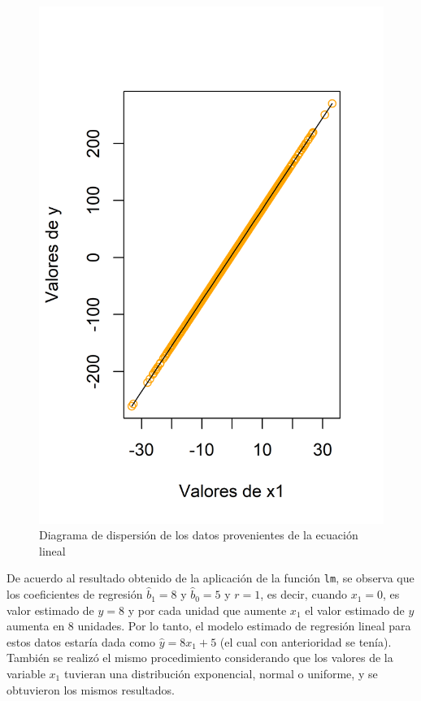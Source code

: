 \documentclass{article}
\begin{document}
\begin{figure}
\centering
\includegraphics[scale=0.9]{Figures/linealsencilla.png}
\caption{Diagrama de dispersión de los datos provenientes de la ecuación lineal}
\label{ec1}
\end{figure}


De acuerdo al resultado obtenido de la aplicación de la función \texttt{lm}, se observa que los coeficientes de regresión $\hat{b}_{1} = 8$ y $\hat{b}_{0} = 5$ y $r = 1$, es decir, cuando $x_{1} = 0$, es valor estimado de $y = 8$ y por cada unidad que aumente $x_{1}$ el valor estimado de $y$ aumenta en $8$ unidades. Por lo tanto, el modelo estimado de regresión lineal para estos datos estaría dada como $\hat{y}=8x_{1}+5$ (el cual con anterioridad se tenía). También se realizó el mismo procedimiento considerando que los valores de la variable $x_{1}$ tuvieran una distribución exponencial, normal o uniforme, y se obtuvieron los mismos resultados.
\end{document}
